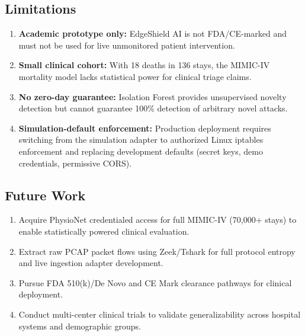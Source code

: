 \documentclass[conference]{IEEEtran}
\begin{document}
\subsection{Limitations}
\begin{enumerate}
    \item \textbf{Academic prototype only:} EdgeShield AI is not FDA/CE-marked and must not be used for live unmonitored patient intervention.
    \item \textbf{Small clinical cohort:} With 18 deaths in 136 stays, the MIMIC-IV mortality model lacks statistical power for clinical triage claims.
    \item \textbf{No zero-day guarantee:} Isolation Forest provides unsupervised novelty detection but cannot guarantee 100\% detection of arbitrary novel attacks.
    \item \textbf{Simulation-default enforcement:} Production deployment requires switching from the simulation adapter to authorized Linux iptables enforcement and replacing development defaults (secret keys, demo credentials, permissive CORS).
\end{enumerate}

\subsection{Future Work}
\begin{enumerate}
    \item Acquire PhysioNet credentialed access for full MIMIC-IV (70{,}000+ stays) to enable statistically powered clinical evaluation.
    \item Extract raw PCAP packet flows using Zeek/Tshark for full protocol entropy and live ingestion adapter development.
    \item Pursue FDA 510(k)/De Novo and CE Mark clearance pathways for clinical deployment.
    \item Conduct multi-center clinical trials to validate generalizability across hospital systems and demographic groups.
\end{enumerate}
\end{document}
